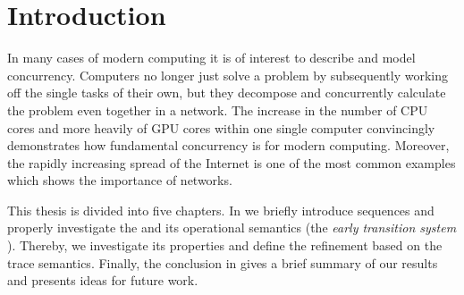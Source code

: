 \chapter{Introduction}
\pagestyle{scrheadings}	
\setcounter{page}{0}
\label{sec_introduction}
In many cases of modern computing it is of interest to describe and model concurrency. Computers no longer just solve a problem by subsequently working off the single tasks of their own, but they decompose and concurrently calculate the problem even together in a network. The increase in the number of CPU cores and more heavily of GPU cores within one single computer convincingly demonstrates how fundamental concurrency is for modern computing. Moreover, the rapidly increasing spread of the Internet is one of the most common examples which shows the importance of networks.

This thesis is divided into five chapters. In  we briefly introduce sequences and properly investigate the \picalc{} and its operational semantics (the \emph{early transition system} \cite{sangiorgi}). Thereby, we investigate its properties and define the refinement based on the trace semantics. Finally, the conclusion in  gives a brief summary of our results and presents ideas for future work.


